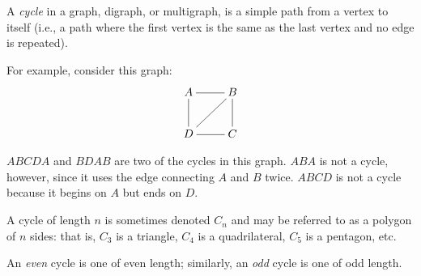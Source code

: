 \documentclass{article}
\begin{document}
A \emph{cycle} in a graph, digraph, or multigraph, is a simple path from a vertex to itself (i.e., a path where the first vertex is the same as the last vertex and no edge is repeated).

For example, consider this graph:
$$\xymatrix{
A \ar@{-}[r] \ar@{-}[d] & B \ar@{-}[dl] \ar@{-}[d] \\
D \ar@{-}[r] & C
}$$

$ABCDA$ and $BDAB$ are two of the cycles in this graph.  $ABA$ is not a cycle, however, since it uses the edge connecting $A$ and $B$ twice.  $ABCD$ is not a cycle because it begins on $A$ but ends on $D$.

A cycle of length $n$ is sometimes denoted $C_n$ and may be referred to as a polygon of $n$ sides: that is, $C_3$ is a triangle, $C_4$ is a quadrilateral, $C_5$ is a pentagon, etc.

An \emph{even} cycle is one of even length; similarly, an \emph{odd} cycle is one of odd length.
\end{document}
